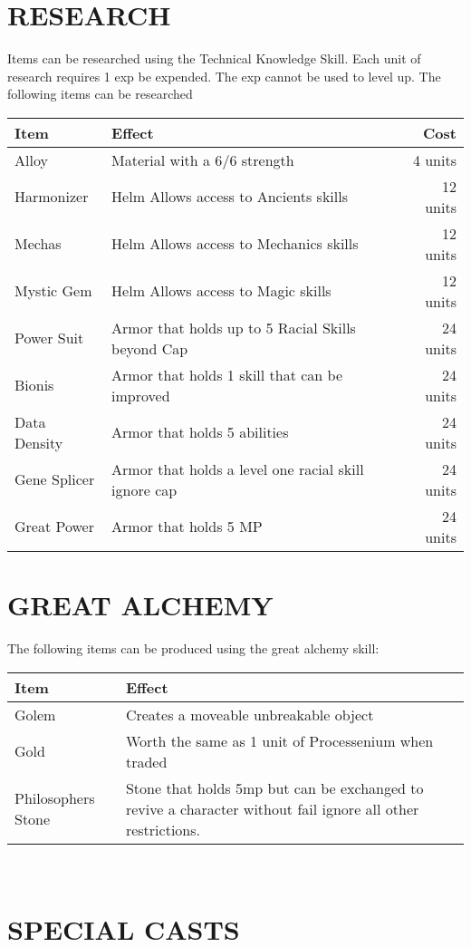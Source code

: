 \section{RESEARCH}
Items can be researched using the Technical Knowledge Skill.  Each unit of research requires 1 exp be expended.  The exp cannot be used to level up.  The following items can be researched\\
\begin{tabularx}{\textwidth}{l X r}
\hline
Item & Effect & Cost \\
\hline
Alloy & Material with a $6/6$ strength & 4 units \\
Harmonizer & Helm Allows access to Ancients skills & 12 units\\
Mechas & Helm Allows access to Mechanics skills & 12 units \\
Mystic Gem & Helm Allows access to Magic skills & 12 units\\
Power Suit & Armor that holds up to 5 Racial Skills beyond Cap & 24 units\\
Bionis & Armor that holds 1 skill that can be improved & 24 units\\
Data Density & Armor that holds 5 abilities& 24 units\\
Gene Splicer & Armor that holds a level one racial skill ignore cap & 24 units \\
Great Power & Armor that holds 5 MP & 24 units\\
\end{tabularx}
\section{GREAT ALCHEMY}
The following items can be produced using the great alchemy skill:\\
\begin{tabularx}{\textwidth}{l X}
\hline
Item & Effect\\
\hline
Golem& Creates a moveable unbreakable object \\
Gold & Worth the same as 1 unit of Processenium when traded\\
Philosophers Stone & Stone that holds 5mp but can be exchanged to revive a character without fail ignore all other restrictions.\\
\end{tabularx}\\

\section{SPECIAL CASTS}


